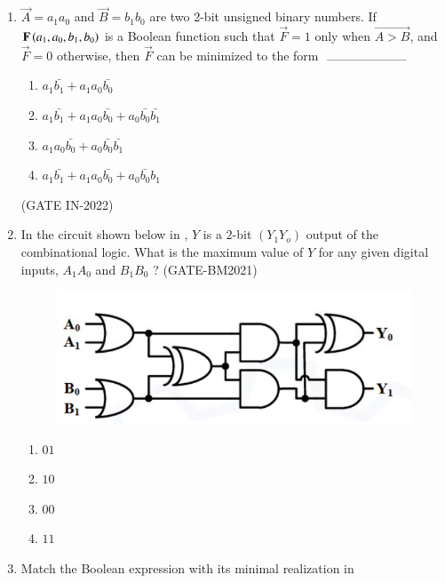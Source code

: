 \begin{enumerate}[label=\arabic*.,ref=\theenumi]
\item $\vec{A}=a_1a_0$ and $\vec{B}=b_1b_0$ are two 2-bit unsigned binary numbers. If $\mathbf{F}\left(a_1,a_0,b_1,b_0\right)$ is a Boolean function such that $\vec{F} = 1$ only when $\vec{A > B}$, and $\vec{F} = 0$ otherwise, then $\vec{F}$ can be minimized to the form $\rule{2.5cm}{0.10mm}$
\begin{enumerate}
\item $a_1\bar{b_1}+a_1a_0\bar{b_0}$
\item $a_1\bar{b_1}+a_1a_0\bar{b_0}+a_0\bar{b_0}\bar{b_1}$
\item $a_1a_0\bar{b_0}+a_0\bar{b_0}\bar{b_1}$
\item $a_1\bar{b_1}+a_1a_0\bar{b_0}+a_0\bar{b_0}b_1$
\end{enumerate}
\hfill(GATE IN-2022)
%
\item In the circuit shown below in 
,
 $Y$ is a $2$-bit $(Y_1Y_o)$ output of the combinational logic. What is the 
maximum value of $Y$ for any given digital inputs, $A_1A_0$ and $B_1B_0$ ?
\hfill(GATE-BM2021)
\begin{figure}[H]
\centering
\includegraphics[width=0.75\columnwidth]{ide/kmap/figs/Fig-1.png}
\caption{}
\label{fig:fig-1.png}
\end{figure}
\begin{enumerate}[label=(\Alph*)]
\item $01$
\item $10$
\item $00$
\item $11$
\end{enumerate}
\item Match the Boolean expression with its minimal realization
	in 
	\begin{table}[H]
		\centering
\end{table}
\end{enumerate}

